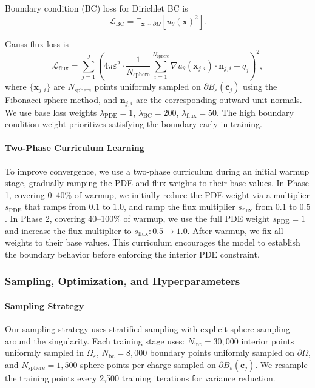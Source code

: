 \documentclass[twoside,11pt]{article}
\newcommand{\E}{\mathbb{E}}
\newcommand{\bx}{\bm{x}}
\newcommand{\bc}{\bm{c}}
\begin{document}
Boundary condition (BC) loss for Dirichlet BC is
\begin{equation}
	\mathcal{L}_{\text{BC}} = \E_{\bx \sim \partial\Omega}\left[u_\theta(\bx)^2\right].
\end{equation}

Gauss-flux loss is
\begin{equation}
	\mathcal{L}_{\text{flux}} = \sum_{j=1}^{J} \left( 4\pi\varepsilon^2 \cdot \frac{1}{N_{\text{sphere}}}\sum_{i=1}^{N_{\text{sphere}}} \nabla u_\theta(\bx_{j,i}) \cdot \mathbf{n}_{j,i} + q_j \right)^2,
\end{equation}
where $\{\bx_{j,i}\}$ are $N_{\text{sphere}}$ points uniformly sampled on $\partial B_\varepsilon(\bc_j)$ using the Fibonacci sphere method, and $\mathbf{n}_{j,i}$ are the corresponding outward unit normals. We use base loss weights $\lambda_{\text{PDE}} = 1$, $\lambda_{\text{BC}} = 200$, $\lambda_{\text{flux}} = 50$. The high boundary condition weight prioritizes satisfying the boundary early in training.

\paragraph{Two-Phase Curriculum Learning}
To improve convergence, we use a two-phase curriculum during an initial warmup stage, gradually ramping the PDE and flux weights to their base values. In Phase 1, covering 0--40\% of warmup, we initially reduce the PDE weight via a multiplier $s_{\text{PDE}}$ that ramps from $0.1$ to $1.0$, and ramp the flux multiplier $s_{\text{flux}}$ from $0.1$ to $0.5$. In Phase 2, covering 40--100\% of warmup, we use the full PDE weight $s_{\text{PDE}}=1$ and increase the flux multiplier to $s_{\text{flux}}: 0.5 \to 1.0$. After warmup, we fix all weights to their base values. This curriculum encourages the model to establish the boundary behavior before enforcing the interior PDE constraint.

\subsubsection{Sampling, Optimization, and Hyperparameters}

\paragraph{Sampling Strategy}

Our sampling strategy uses stratified sampling with explicit sphere sampling around the singularity. Each training stage uses:
$N_{\text{int}} = 30{,}000$ interior points uniformly sampled in $\Omega_\varepsilon$, $N_{\text{bc}} = 8{,}000$ boundary points uniformly sampled on $\partial\Omega$, and $N_{\text{sphere}} = 1{,}500$ sphere points per charge sampled on $\partial B_\varepsilon(\bc_j)$.
We resample the training points every 2,500 training iterations for variance reduction.
\end{document}
